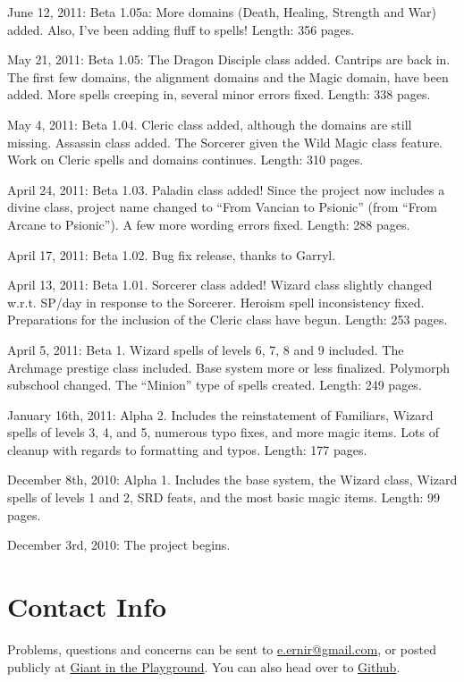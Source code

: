 \begin{list}{}{\leftmargin=1em}
 \item June 12, 2011: Beta 1.05a: More domains (Death, Healing, Strength and War) added.
 Also, I've been adding fluff to spells! Length: 356 pages.
 \item May 21, 2011: Beta 1.05: The Dragon Disciple class added. Cantrips are back in. The first few domains, the alignment domains and the Magic domain, have been added.
 More spells creeping in, several minor errors fixed. Length: 338 pages.
 \item May 4, 2011: Beta 1.04. Cleric class added, although the domains are still missing.
 Assassin class added. The Sorcerer given the Wild Magic class feature. Work on Cleric spells and domains continues.
 Length: 310 pages.
 \item April 24, 2011: Beta 1.03. Paladin class added! Since the project now includes a divine class, project name changed to ``From Vancian to Psionic''
 (from ``From Arcane to Psionic''). A few more wording errors fixed. Length: 288 pages.
 \item April 17, 2011: Beta 1.02. Bug fix release, thanks to Garryl.
 \item April 13, 2011: Beta 1.01. Sorcerer class added! Wizard class slightly changed w.r.t. SP/day in response to the Sorcerer. Heroism spell inconsistency fixed.
 Preparations for the inclusion of the Cleric class have begun.
 Length: 253 pages.
 \item April 5, 2011: Beta 1. Wizard spells of levels 6, 7, 8 and 9 included. The Archmage prestige class included.
 Base system more or less finalized. Polymorph subschool changed. The ``Minion'' type of spells created.
 Length: 249 pages.
 \item January 16th, 2011: Alpha 2. Includes the reinstatement of Familiars, Wizard spells of levels 3, 4, and 5, numerous typo fixes, and more magic items.
 Lots of cleanup with regards to formatting and typos. Length: 177 pages.
 \item December 8th, 2010: Alpha 1. Includes the base system, the Wizard class, Wizard spells of levels 1 and 2, SRD feats,
 and the most basic magic items. Length: 99 pages.
 \item December 3rd, 2010: The project begins.
\end{list}
\section{Contact Info}
Problems, questions and concerns can be sent to
\href{mailto:e.ernir@gmail.com}{e.ernir@gmail.com}, or posted publicly at \href{http://www.giantitp.com/forums/showthread.php?t=194002}{Giant in the Playground}. You can also head over to \href{https://github.com/Ernir/VancianToPsionics}{Github}.
